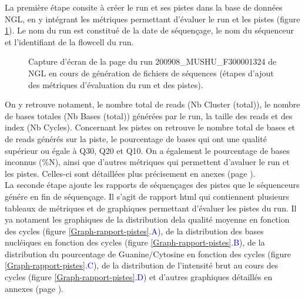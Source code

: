 La première étape consite à créer le run et ses pistes dans la base de données NGL, en y intégrant les métriques permettant d'évaluer le run et les pistes (figure \ref{NGL-screenshot_run-lane}).
Le nom du run est constitué de la date de séquençage, le nom du séquenceur et l'identifiant de la flowcell du run.

\begin{figure}[H]
    \centering
    \caption{\footnotesize{Capture d'écran de la page du run 200908\_MUSHU\_F300001324 de NGL en cours de génération de fichiers de séquences (étapes d'ajout des métriques d'évaluation du run et des pistes).}}
    \label{NGL-screenshot_run-lane}
\end{figure}

On y retrouve notament, le nombre total de reads (Nb Cluster (total)), le nombre de bases totales (Nb Bases (total)) générées par le run, la taille des reads et des index (Nb Cycles).
Concernant les pistes on retrouve le nombre total de bases et de reads générés sur la piste, le pourcentage de bases qui ont une qualité supérieur ou égale à Q30, Q20 et Q10. On a également le pourcentage de bases inconnus (\%N), ainsi que d'autres métriques qui permettent d'avaluer le run et les pistes. Celles-ci sont détaillées plus précisement en anexes (page \pageref{anexes1}).\\

La seconde étape ajoute les rapports de séquençages des pistes que le séquenceurs génére en fin de séquençage.
Il s'agit de rapport html qui contiennent plusieurs tableaux de métriques et de graphiques permettant d'évaluer les pistes du run.
Il ya notament les graphiques de la distribution dela qualité moyenne en fonction des cycles (figure \ref{Graph-rapport-pistes}\textcolor{blue}{.A}), de la distribution des bases nucléiques en fonction des cycles (figure \ref{Graph-rapport-pistes}\textcolor{blue}{.B}), de la distribution du pourcentage de Guanine/Cytosine en fonction des cycles (figure \ref{Graph-rapport-pistes}\textcolor{blue}{.C}), de la distribution de l'intensité brut au cours des cycles (figure \ref{Graph-rapport-pistes}\textcolor{blue}{.D}) et d'autres graphiques détaillés en annexes (page \pageref{anexes2}).

